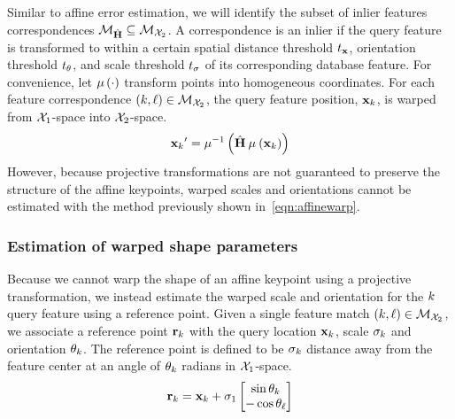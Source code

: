        Similar to affine error estimation, we will identify the subset
          of inlier features correspondences $\mathcal{M}_{\hat{\mathbf{H}}}
          \subseteq \mathcal{M}_{\mathcal{X}_{2}}$.
        A correspondence is an inlier if the query feature is
          transformed to within a certain spatial distance threshold
          $t_{\mathbf{x}}$, orientation threshold $t_{{\theta}}$, and scale
          threshold $t_{{\sigma}}$ of its corresponding database feature.
        For convenience, let $\mathbin{\mu}\left(\cdot\right)$ transform points into
          homogeneous coordinates.
        For each feature correspondence $(k, \ell) \in
          \mathcal{M}_{\mathcal{X}_{2}}$, the query feature position, ${\mathbf{x}_{k}}$, is
          warped from $\mathcal{X}_{1}$-space into $\mathcal{X}_{2}$-space.
        \begin{equation}
            {{\ensuremath{\mathbf{x}}_{k}}}' = \mathbin{\mu^{-1}}\left(\hat{\mathbf{H}} \mathbin{\mu}\left({\mathbf{x}_{k}}\right)\right)
        \end{equation}
        However, because projective transformations are not guaranteed
          to preserve the structure of the affine keypoints, warped
          scales and orientations cannot be estimated with the method
          previously shown in~\cref{eqn:affinewarp}.

        \subsubsection{Estimation of warped shape parameters}
        Because we cannot warp the shape of an affine keypoint using a
          projective transformation, we instead estimate the warped scale
          and orientation for the $k$\th{} query feature using a
          reference point.
        Given a single feature match $(k, \ell) \in
          \mathcal{M}_{\mathcal{X}_{2}}$, we associate a reference point ${\mathbf{r}_{k}}$
          with the query location ${\mathbf{x}_{k}}$, scale ${\sigma_{k}}$ and orientation
          ${\theta_{k}}$.
        The reference point is defined to be ${\sigma_{k}}$ distance away
          from the feature center at an angle of ${\theta_{k}}$ radians in
          $\mathcal{X}_{1}$-space.
          \begin{equation}
            {\ensuremath{\mathbf{r}}_{k}} = {\mathbf{x}_{k}} + \sigma_1 \begin{bmatrix} \sin{{\theta_{k}}} \\ -\cos{{\theta_{\ell}}} \end{bmatrix}
          \end{equation}

